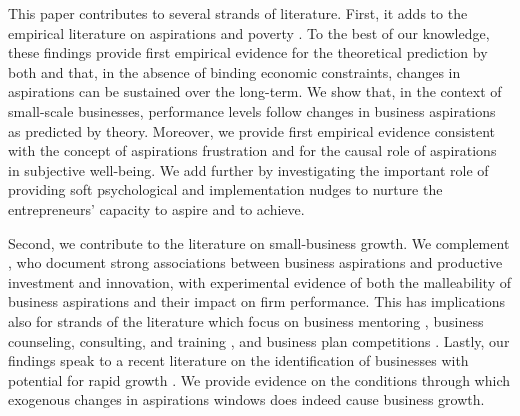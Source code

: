 \documentclass[11.5pt]{article}
\begin{document}
This paper contributes to several strands of literature. First, it adds to the empirical literature on aspirations and poverty \citep[e.g.,][]{Bernard2014, Riley2017, Beaman2012, Janzen2017}. To the best of our knowledge, these findings provide first empirical evidence for the theoretical prediction by both \citet{Genicot2017} and \citet{Dalton2016} that, in the absence of binding economic constraints, changes in aspirations can be sustained over the long-term. We show that, in the context of small-scale businesses, performance levels follow changes in business aspirations as predicted by theory. Moreover, we provide first empirical evidence consistent with the concept of aspirations frustration \citep{Ray2006, Genicot2017} and for the causal role of aspirations in subjective well-being. %
We add further by investigating the important role of providing soft psychological and implementation nudges to nurture the entrepreneurs' capacity to aspire and to achieve.

Second, we contribute to the literature on small-business growth. We complement \citet{Dalton2018}, who document strong associations between business aspirations and productive investment and innovation, with experimental evidence of both the malleability of business aspirations and their impact on firm performance.%
 This has implications also for strands of the literature which focus on business mentoring \citep[e.g.,][]{Brooks2018, Cai2017}, business counseling, consulting, and training \citep[for reviews see,][]{Carpena2017, McKenzie2014}, and business plan competitions \citep[e.g.,][]{McKenzie2017a, Bjorvatn2015}. Lastly, our findings speak to a recent literature on the identification of businesses with potential for rapid growth \citep[see,][]{Fafchamps2016, Fafchamps2017}. We provide evidence on the conditions through which exogenous changes in aspirations windows does indeed cause business growth. %
\end{document}
